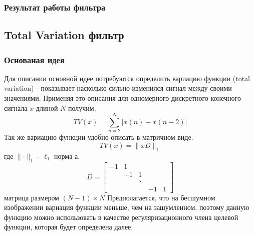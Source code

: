 \subsubsection{Результат работы фильтра}
\begin{figure}[H]\label{img:bm3d}
	\begin{minipage}[H]{0.49\linewidth}
	\end{minipage}
	\begin{minipage}[H]{0.49\linewidth}
	\end{minipage}
\end{figure}

\subsection{Total Variation фильтр}
\subsubsection{Основаная идея}
Для описании основной идее потребуются определить вариацию функции (total variation) - показывает насколько сильно изменился сигнал между своими значениями. Применяя это описания для одномерного дискретного конечного сигнала $x$ длиной $N$ получим. 
\begin{equation}\label{eq:TV}
TV(x)=\sum_{n=2}^N|x(n) - x(n-2)|
\end{equation}
Так же вариацию функции удобно описать в матричном виде.
\begin{equation}\label{eq:TV:m}
	TV(x) = \parallel xD\parallel_1
\end{equation}
где $\parallel  \cdot  \parallel_1$ - $\ell_1$  норма а,
\begin{equation}\label{eq:TV:matrix}
D = \left[
\begin{array}{ccccc}
-1 & 1 & & & \\
 & -1 &  1& & \\
 & & \ddots & & \\
 &  &  & -1  & 1 
\end{array}
\right]
\end{equation}
матрица размером $(N-1)\times N$
Предполагается, что на бесшумном изображении вариация функции меньше, чем на зашумленном, поэтому данную функцию можно использовать в качестве регуляризационного члена целевой функции, которая будет определена далее.
